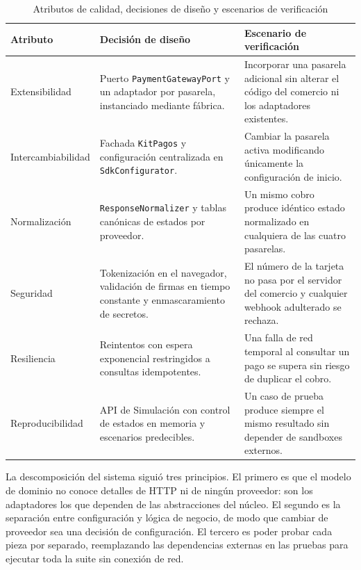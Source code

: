 \begin{table}[H]
  \centering
  \small
  \renewcommand{\arraystretch}{1.2}
  \begin{tabularx}{\textwidth}{|>{\raggedright\arraybackslash}p{2.9cm}|>{\raggedright\arraybackslash}X|>{\raggedright\arraybackslash}p{4.1cm}|}
    \hline
    \textbf{Atributo} & \textbf{Decisión de diseño} & \textbf{Escenario de verificación} \\ \hline
    Extensibilidad & Puerto \texttt{PaymentGatewayPort} y un adaptador por pasarela, instanciado mediante fábrica. & Incorporar una pasarela adicional sin alterar el código del comercio ni los adaptadores existentes. \\ \hline
    Intercambiabilidad & Fachada \texttt{KitPagos} y configuración centralizada en \texttt{SdkConfigurator}. & Cambiar la pasarela activa modificando únicamente la configuración de inicio. \\ \hline
    Normalización & \texttt{ResponseNormalizer} y tablas canónicas de estados por proveedor. & Un mismo cobro produce idéntico estado normalizado en cualquiera de las cuatro pasarelas. \\ \hline
    Seguridad & Tokenización en el navegador, validación de firmas en tiempo constante y enmascaramiento de secretos. & El número de la tarjeta no pasa por el servidor del comercio y cualquier webhook adulterado se rechaza. \\ \hline
    Resiliencia & Reintentos con espera exponencial restringidos a consultas idempotentes. & Una falla de red temporal al consultar un pago se supera sin riesgo de duplicar el cobro. \\ \hline
    Reproducibilidad & API de Simulación con control de estados en memoria y escenarios predecibles. & Un caso de prueba produce siempre el mismo resultado sin depender de sandboxes externos. \\ \hline
  \end{tabularx}
  \caption{Atributos de calidad, decisiones de diseño y escenarios de verificación}
  \label{tab:asr-memoria}
\end{table}

La descomposición del sistema siguió tres principios. El primero es que el modelo de dominio no conoce detalles de HTTP ni de ningún proveedor: son los adaptadores los que dependen de las abstracciones del núcleo. El segundo es la separación entre configuración y lógica de negocio, de modo que cambiar de proveedor sea una decisión de configuración. El tercero es poder probar cada pieza por separado, reemplazando las dependencias externas en las pruebas para ejecutar toda la suite sin conexión de red.

